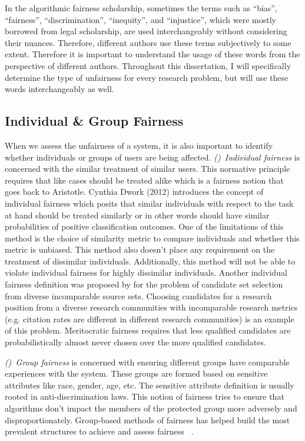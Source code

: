     In the algorithmic fairness scholarship, sometimes the terms such as ``bias'', ``fairness'', ``discrimination'', ``inequity'', and ``injustice'', which were mostly borrowed from legal scholarship, are used interchangeably without considering their nuances. Therefore, different authors use these terms subjectively to some extent. Therefore it is important to understand the usage of these words from the perspective of different authors. Throughout this dissertation, I will specifically determine the type of unfairness for every research problem, but will use these words interchangeably as well.
    
    \subsection{Individual \& Group Fairness}
        
        When we assess the unfairness of a system, it is also important to identify whether individuals or groups of users are being affected. \textit{()~Individual fairness} is concerned with the similar treatment of similar users. This normative principle requires that like cases should be treated alike \cite{binns2020conflict} which is a fairness notion that goes back to Aristotle. Cynthia Dwork (2012) \cite{Dwork2012individual} introduces the concept of individual fairness which posits that similar individuals with respect to the task at hand should be treated similarly or in other words should have similar probabilities of positive classification outcomes. One of the limitations of this method is the choice of similarity metric to compare individuals and whether this metric is unbiased. This method also doesn't place any requirement on the treatment of dissimilar individuals. Additionally, this method will not be able to violate individual fairness for highly dissimilar individuals. Another individual fairness definition was proposed by \cite{pmlr-v70-kearns17a} for the problem of candidate set selection from diverse incomparable source sets. Choosing candidates for a research position from a diverse research communities with incomparable research metrics (e.g. citation rates are different in different research communities) is an example of this problem. Meritocratic fairness requires that less qualified candidates are probabilistically almost never chosen over the more qualified candidates.
        
        \textit{()~Group fairness} is concerned with ensuring different groups have comparable experiences with the system. These groups are formed based on sensitive attributes like race, gender, age, etc. The sensitive attribute definition is usually rooted in anti-discrimination laws\cite{barocas2016big}. This notion of fairness tries to ensure that algorithms don't impact the members of the protected group more adversely and disproportionately. Group-based methods of fairness has helped build the most prevalent structures to achieve and assess fairness ~\cite{zemel2013learning,kamishima2012fairness,kamiran2010discrimination,zhang2017anti}.
        
